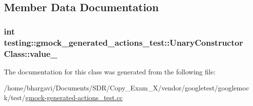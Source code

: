 \subsection{Member Data Documentation}
\subsubsection[{\texorpdfstring{value\+\_\+}{value_}}]{\setlength{\rightskip}{0pt plus 5cm}int testing\+::gmock\+\_\+generated\+\_\+actions\+\_\+test\+::\+Unary\+Constructor\+Class\+::value\+\_\+}\hypertarget{classtesting_1_1gmock__generated__actions__test_1_1_unary_constructor_class_a5e96ce337c5eb7016eba2ea66ae46851}{}\label{classtesting_1_1gmock__generated__actions__test_1_1_unary_constructor_class_a5e96ce337c5eb7016eba2ea66ae46851}


The documentation for this class was generated from the following file\+:\begin{DoxyCompactItemize}
\item 
/home/bhargavi/\+Documents/\+S\+D\+R/\+Copy\+\_\+\+Exam\+\_\+X/vendor/googletest/googlemock/test/\hyperlink{gmock-generated-actions__test_8cc}{gmock-\/generated-\/actions\+\_\+test.\+cc}\end{DoxyCompactItemize}
